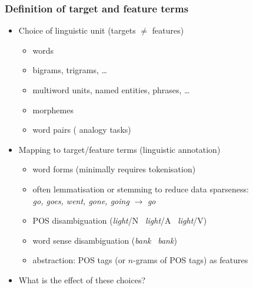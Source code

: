 \documentclass[t]{beamer} %
\begin{document}
\begin{frame}
\end{frame}


\begin{frame}
  \frametitle{Definition of target and feature terms}

  \ungap
  \begin{itemize}
  \item Choice of linguistic unit (targets $\neq$ features)
    \begin{itemize}
    \item words
    \item bigrams, trigrams, \ldots
    \item multiword units, named entities, phrases, \ldots
    \item morphemes
    \item word pairs (\hand{} analogy tasks)
    \end{itemize}
    \gap
  \item<2-> Mapping to target/feature terms (\so linguistic annotation)
    \begin{itemize}
    \item word forms (minimally requires tokenisation)
    \item often lemmatisation or stemming to reduce data sparseness:\\
      \emph{go, goes, went, gone, going} $\to$ \emph{go}
    \item POS disambiguation (\emph{light}/N \vs\ \emph{light}/A \vs\ \emph{light}/V)
    \item word sense disambiguation (\emph{bank} \vs\ \emph{bank})
    \item abstraction: POS tags (or $n$-grams of POS tags) as features
    \end{itemize}
    \gap
  \item<3->[\hand] What is the effect of these choices?
  \end{itemize}
\end{frame}
\end{document}
